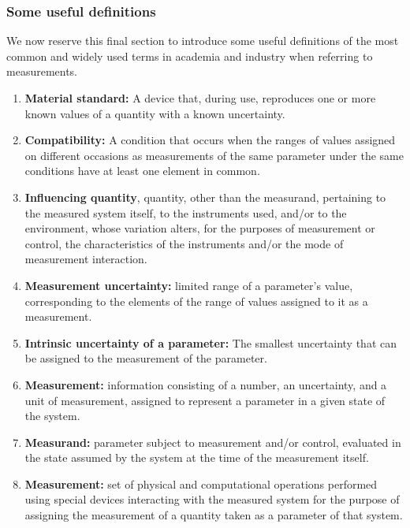 \documentclass[../main.tex]{subfiles}
\begin{document}
\subsubsection{Some useful definitions} %

We now reserve this final section to introduce some useful definitions of the most common and widely used terms in academia and industry when referring to measurements.

\begin{enumerate}
	\item[\textbf{-}]\textbf{Material standard:} A device that, during use, reproduces one or more known values of a quantity with a known uncertainty.
	
	\item[\textbf{-}]\textbf{Compatibility:} A condition that occurs when the ranges of values assigned on different occasions as measurements of the same parameter under the same conditions have at least one element in common.
	
	\item[\textbf{-}]\textbf{Influencing quantity}, quantity, other than the measurand, pertaining to the measured system itself, to the instruments used, and/or to the environment, whose variation alters, for the purposes of measurement or control, the characteristics of the instruments and/or the mode of measurement interaction. 
	
	\item[\textbf{-}]\textbf{Measurement uncertainty:}  limited range of a parameter’s value, corresponding to the elements of the range of values assigned to it as a measurement.
	
	\item[\textbf{-}]\textbf{Intrinsic uncertainty of a parameter:} The smallest uncertainty that can be assigned to the measurement of the parameter.
	
	\item[\textbf{-}]\textbf{Measurement:} information consisting of a number, an uncertainty, and a unit of measurement, assigned to represent a parameter in a given state of the system.

	\item[\textbf{-}]\textbf{Measurand:} parameter subject to measurement and/or control, evaluated in the state assumed by the system at the time of the measurement itself.
	
	\item[\textbf{-}]\textbf{Measurement:} set of physical and computational operations performed using special devices interacting with the measured system for the purpose of assigning the measurement of a quantity taken as a parameter of that system.


\end{enumerate}
\end{document}
